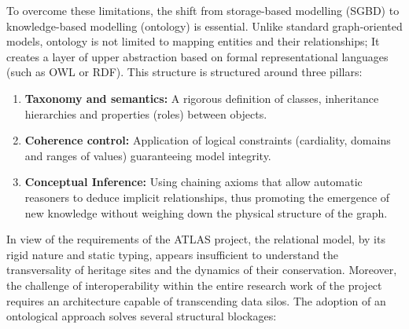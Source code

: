 \documentclass{article}
\begin{document}
To overcome these limitations, the shift from storage-based modelling (SGBD) to knowledge-based modelling (ontology) is essential. Unlike standard graph-oriented models, ontology is not limited to mapping entities and their relationships; It creates a layer of upper abstraction based on formal representational languages (such as OWL or RDF). This structure is structured around three pillars:
\begin{enumerate}
\item \textbf {Taxonomy and semantics:} A rigorous definition of classes, inheritance hierarchies and properties (roles) between objects.
\item \textbf {Coherence control:} Application of logical constraints (cardiality, domains and ranges of values) guaranteeing model integrity.
\item \textbf {Conceptual Inference:} Using chaining axioms that allow automatic reasoners to deduce implicit relationships, thus promoting the emergence of new knowledge without weighing down the physical structure of the graph.
\end{enumerate}

In view of the requirements of the ATLAS project, the relational model, by its rigid nature and static typing, appears insufficient to understand the transversality of heritage sites and the dynamics of their conservation. Moreover, the challenge of interoperability within the entire research work of the project requires an architecture capable of transcending data silos. The adoption of an ontological approach solves several structural blockages:
\end{document}
